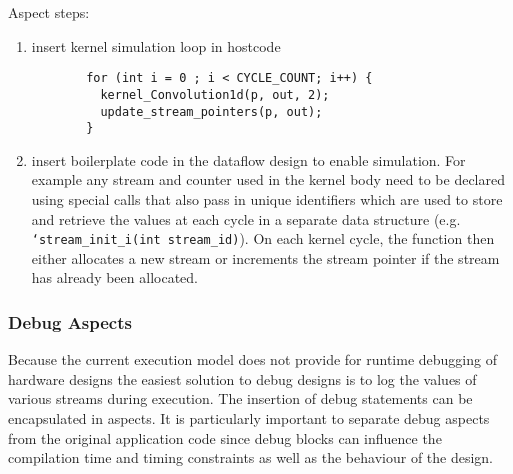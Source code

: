 Aspect steps:

\begin{enumerate}

\item insert kernel simulation loop in hostcode %


\begin{figure}[!h]
\begin{lstlisting}
  for (int i = 0 ; i < CYCLE_COUNT; i++) {
    kernel_Convolution1d(p, out, 2);
    update_stream_pointers(p, out);
  }
\end{lstlisting}
\end{figure}

\item insert boilerplate code in the dataflow design to enable simulation.
  For example any stream and counter used in the kernel body need to
  be declared using special calls that also pass in unique identifiers
  which are used to store and retrieve the values at each cycle in a
  separate data structure (e.g. \texttt{`stream\_init\_i(int
    stream\_id)}). On each kernel cycle, the function then either
  allocates a new stream or increments the stream pointer if the
  stream has already been allocated.
\begin{comment}
\begin{figure}[!h]
\begin{lstlisting}
  float* i4 = count_i(1000, 1, 0);
  float* i1 = countChain_i(n1, 1, i4, 0);
\end{lstlisting}
\caption{Applying the simulation aspect to the dataflow design in
  Figure \ref{fig:maxc-1dconv}}
\label{fig:maxc-sim-aspect}
\end{figure}
\end{comment}

\end{enumerate}

\lstset{style=MaxC}

\subsubsection{Debug Aspects}

Because the current execution model does not provide for runtime
debugging of hardware designs the easiest solution to debug designs is
to log the values of various streams during execution. The insertion
of debug statements can be encapsulated in aspects. It is particularly
important to separate debug aspects from the original application code
since debug blocks can influence the compilation time and timing
constraints as well as the behaviour of the design.

